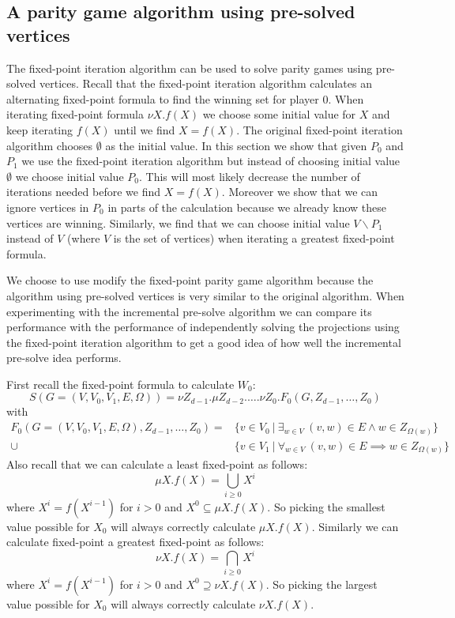 \subsection{A parity game algorithm using pre-solved vertices}
The fixed-point iteration algorithm can be used to solve parity games using pre-solved vertices. Recall that the fixed-point iteration algorithm calculates an alternating fixed-point formula to find the winning set for player 0. When iterating fixed-point formula $\nu X.f(X)$ we choose some initial value for $X$ and keep iterating $f(X)$ until we find $X = f(X)$. The original fixed-point iteration algorithm chooses $\emptyset$ as the initial value. In this section we show that given $P_0$ and $P_1$ we use the fixed-point iteration algorithm but instead of choosing initial value $\emptyset$ we choose initial value $P_0$. This will most likely decrease the number of iterations needed before we find $X = f(X)$. Moreover we show that we can ignore vertices in $P_0$ in parts of the calculation because we already know these vertices are winning. Similarly, we find that we can choose initial value $V\backslash P_1$ instead of $V$ (where $V$ is the set of vertices) when iterating a greatest fixed-point formula. 

We choose to use modify the fixed-point parity game algorithm because the algorithm using pre-solved vertices is very similar to the original algorithm. When experimenting with the incremental pre-solve algorithm we can compare its performance with the performance of independently solving the projections using the fixed-point iteration algorithm to get a good idea of how well the incremental pre-solve idea performs.

First recall the fixed-point formula to calculate $W_0$:
\[ S(G = (V,V_0,V_1,E,\Omega)) = \nu Z_{d-1}. \mu Z_{d-2}. \dots . \nu Z_0. F_0(G,Z_{d-1},\dots,Z_0) \]
with
\begin{align*}
	F_0(G = (V,V_0,V_1,E,\Omega),Z_{d-1},\dots,Z_0) = &\{ v \in V_0\ |\ \exists_{w\in V}\ (v,w) \in E \wedge w\in Z_{\Omega(w)} \}\\
	\cup &\{ v \in V_1\ |\ \forall_{w\in V}\ (v,w) \in E \implies w\in Z_{\Omega(w)} \}
\end{align*}
Also recall that we can calculate a least fixed-point as follows:
\[ \mu X.f(X) = \bigcup_{i \geq 0} X^i \]
where $X^i = f(X^{i-1})$ for $i > 0$ and $X^0 \subseteq \mu X.f(X)$. So picking the smallest value possible for $X_0$ will always correctly calculate $\mu X. f(X)$.
Similarly we can calculate fixed-point a greatest fixed-point as follows:
\[ \nu X.f(X) = \bigcap_{i \geq 0} X^i \]
where $X^i = f(X^{i-1})$ for $i > 0$ and $X^0 \supseteq \nu X.f(X)$. So picking the largest value possible for $X_0$ will always correctly calculate $\nu X. f(X)$.

